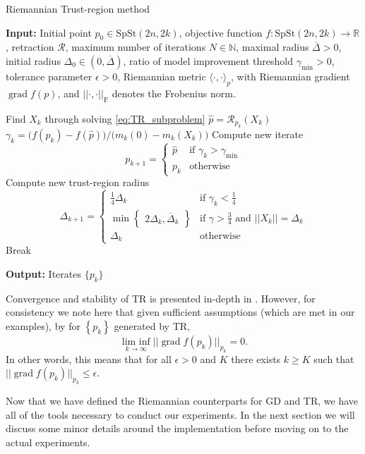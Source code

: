 \begin{algorithm}[H]
    \caption{Riemannian Trust-region method}\label{alg:Trust_region}
    \textbf{Input:} Initial point $p_{0}\in \mathrm{SpSt}(2n, 2k)$, objective function $f\colon\mathrm{SpSt}(2n, 2k)\to \mathbb{R}$, retraction $\mathcal{R}$, maximum number of iterations $N\in \mathbb{N}$,  maximal radius $\overline{\Delta}>0$, initial radius $\Delta_{0}\in(0,\overline{\Delta})$, ratio of model improvement threshold $\gamma_{\text{min}}>0$, tolerance parameter $\epsilon>0$, Riemannian metric $\langle \cdot,\cdot \rangle_{p}$, with Riemannian gradient $\operatorname{grad}f(p)$, and $\lvert \lvert \cdot,\cdot \rvert  \rvert_{\text{F}}$ denotes the Frobenius norm.
    \begin{algorithmic}[1]
        \State Find $X_{k}$ through solving \eqref{eq:TR_subproblem}
        \State $\hat{p}=\mathcal{R}_{p_{k}}(X_{k})$
        \State $\gamma_{k}=\big(f(p_{k})-f(\hat{p})\big)/\big(m_{k}(0)-m_{k}(X_{k})\big)$
        \State Compute new iterate\begin{equation*}
            p_{k+1}=
            \begin{cases}
            \hat{p} & \text{if }\gamma_{k}>\gamma_{\text{min}} \\
            p_{k}  & \text{otherwise}
            \end{cases}
            \end{equation*}
        \State Compute new trust-region radius\begin{equation*}
    \Delta_{k+1}=
    \begin{cases}
    \frac{1}{4}\Delta_{k} & \text{if }\gamma_{k}<\frac{1}{4} \\
    \operatorname{min}\begin{Bmatrix}2\Delta_{k},\overline{\Delta}_{k}\end{Bmatrix} & \text{if }\gamma>\frac{3}{4}\text{ and }\lvert \lvert X_{k} \rvert  \rvert =\Delta_{k} \\
    \Delta_{k} & \text{otherwise}
    \end{cases}
    \end{equation*}  
        \State Break
        \EndIf
    \EndFor
    \end{algorithmic}
    \textbf{Output:} Iterates $\{p_{k}\}$
\end{algorithm}

Convergence and stability of TR is presented in-depth in \cite[p.~147]{Boumal2023}. However, for consistency we note here that given sufficient assumptions (which are met in our examples), by \cite[Cor.~6.24]{Boumal2023} for $\left\{ p_{k} \right\}$ generated by TR,
%
\begin{equation*}
\operatorname*{lim~inf}_{ k \to \infty }\lvert \lvert \operatorname{grad}f(p_{k}) \rvert  \rvert _{p_{k}}=0.
\end{equation*}
%
In other words, this means that for all $\epsilon>0$ and $K$ there exists $k\geq K$ such that $\lvert \lvert \operatorname{grad}f(p_{k}) \rvert \rvert_{p_{k}}\leq\epsilon$. 

Now that we have defined the Riemannian counterparts for GD and TR, we have all of the tools necessary to conduct our experiments. In the next section we will discuss some minor details around the implementation before moving on to the actual experiments.